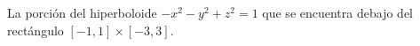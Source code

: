\item La porción del hiperboloide $-x^2 - y^2 + z^2 = 1$ que se encuentra debajo del rectángulo $[-1, 1] \times [-3, 3]$.
